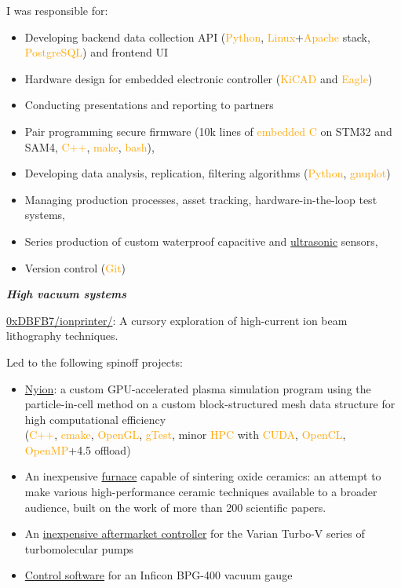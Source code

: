 \documentclass[fleqn,11pt]{article}
\newcommand{\ressection}[1]{\textbf{{\Large \textit{#1}}}\xrfill[0.1ex]{0.6pt}}
\newcommand{\sk}[1]{\textcolor{orange}{#1}}
\newcommand{\itemoptions}{\setlength{\itemindent}{-10pt} \setlength\itemsep{-1em}}
\begin{document}
I was responsible for:
\begin{itemize}\itemoptions
\item Developing backend data collection API (\sk{Python}, \sk{Linux}+\sk{Apache} stack, \sk{PostgreSQL}) and frontend UI
\item Hardware design for embedded electronic controller (\sk{KiCAD} and \sk{Eagle})
\item  Conducting presentations and reporting to partners
\item Pair programming secure firmware (10k lines of \sk{embedded C} on STM32 and SAM4, \sk{C++}, \sk{make}, \sk{bash}), 
\item Developing data analysis, replication, filtering algorithms (\sk{Python}, \sk{gnuplot})
\item Managing production processes, asset tracking, hardware-in-the-loop test systems, 
\item Series production of custom waterproof capacitive and \href{https://github.com/0xDBFB7/UltimateUltrasonicAmplifier}{ultrasonic} sensors,
\item Version control (\sk{Git})
\end{itemize}



\ressection{High vacuum systems}

\href{https://github.com/0xDBFB7/ionprinter/}{0xDBFB7/ionprinter/}: A cursory exploration of high-current ion beam lithography techniques. 

Led to the following spinoff projects:
\begin{itemize}\itemoptions
	\item \href{https://github.com/0xDBFB7/Nyion}{Nyion}: a custom GPU-accelerated plasma simulation program using the particle-in-cell method on a custom block-structured mesh data structure for high computational efficiency\\
	(\sk{C++}, \sk{cmake}, \sk{OpenGL}, \sk{gTest}, minor \sk{HPC} with \sk{CUDA}, \sk{OpenCL}, \sk{OpenMP}+4.5 offload)
	\item An inexpensive \href{https://0xdbfb7.com/furnace.html}{furnace} capable of sintering oxide ceramics: an attempt to make various high-performance ceramic techniques available to a broader audience, built on the work of more than 200 scientific papers. 
	\item An \href{https://github.com/0xDBFB7/varian-turbo-controller}{inexpensive aftermarket controller} for the Varian Turbo-V series of turbomolecular pumps 
	\item \href{https://gist.github.com/0xDBFB7/7bd7048c6639270e6f291a2673903184}{Control software} for an Inficon BPG-400 vacuum gauge
\end{itemize}
\pagebreak
\end{document}
